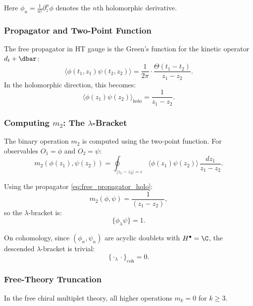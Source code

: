 Here $\phi_n = \frac{1}{n!} \partial_z^n \phi$ denotes the $n$th holomorphic derivative.
\subsubsection{Propagator and Two-Point Function}
The free propagator in HT gauge is the Green's function for the kinetic operator $d_t + \dbar$:
\begin{equation}
\langle \phi(t_1, z_1) \psi(t_2, z_2) \rangle = \frac{1}{2\pi} \cdot \frac{\Theta(t_1 - t_2)}{z_1 - z_2}.
\end{equation}
In the holomorphic direction, this becomes:
\begin{equation}
\langle \phi(z_1) \psi(z_2) \rangle_{\text{holo}} = \frac{1}{z_1 - z_2}.
\end{equation}

\subsubsection{Computing $m_2$: The $\lambda$-Bracket}
The binary operation $m_2$ is computed using the two-point function. For observables $O_1 = \phi$ and $O_2 = \psi$:
\begin{equation}
m_2(\phi(z_1), \psi(z_2)) = \oint_{|z_1 - z_2| = \varepsilon} \langle \phi(z_1) \psi(z_2) \rangle \, \frac{dz_1}{z_1 - z_2}.
\end{equation}

Using the propagator \eqref{eq:free_propagator_holo}:
\begin{equation}
m_2(\phi, \psi) = \frac{1}{(z_1 - z_2)},
\end{equation}
so the $\lambda$-bracket is:
\begin{equation}
\{\phi_\lambda \psi\} = 1.
\end{equation}

On cohomology, since $(\phi_n, \psi_n)$ are acyclic doublets with $H^\bullet = \C$, the descended $\lambda$-bracket is trivial:
\begin{equation}
\{\cdot_\lambda \cdot\}_{\text{coh}} = 0.
\end{equation}

\subsubsection{Free-Theory Truncation}

\begin{proposition}[All $m_{k \geq 3} = 0$ for Free Theory]
In the free chiral multiplet theory, all higher operations $m_k = 0$ for $k \geq 3$.
\end{proposition}

